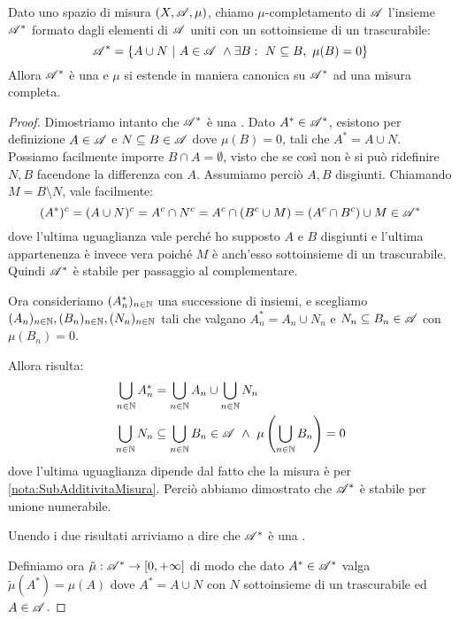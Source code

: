 \begin{proposition}\label{prop:CompletamentoMisura}
	Dato uno spazio di misura $(X,\mathscr A,\mu)$, chiamo $\mu$-completamento di $\mathscr A$ l'insieme $\mathscr A^*$ formato dagli elementi di $\mathscr A$ uniti con un sottoinsieme di un trascurabile:
	\begin{equation*}
		\A^*=\{A\cup N\ |\ A\in\A\ \wedge \exists B:\ N\subseteq B,\ \mu(B)=0\}
	\end{equation*}
	Allora $\mathscr A^*$ è una \sigalg{} e $\mu$ si estende in maniera canonica su $\mathscr A^*$ ad una misura completa.
\end{proposition}
\begin{proof}
	Dimostriamo intanto che $\mathscr A^*$ è una \sigalg{}.
	Dato $A^*\in\mathscr A^*$, esistono per definizione $A\in\mathscr A$ e $N\subseteq B\in\mathscr A$ dove $\mu(B)=0$, tali che $A^*=A\cup N$. Possiamo facilmente imporre $B\cap A=\emptyset$, visto che se così non è si può ridefinire $N,B$ facendone la differenza con $A$. Assumiamo perciò $A,B$ disgiunti.
	Chiamando $M=B\setminus N$, vale facilmente:
	\begin{equation*}
		(A^*)^c=(A\cup N)^c=A^c\cap N^c=A^c\cap(B^c\cup M)=(A^c\cap B^c )\cup M \in\mathscr A^*
	\end{equation*}
	dove l'ultima uguaglianza vale perché ho supposto $A$ e $B$ disgiunti e l'ultima appartenenza è invece vera poiché $M$ è anch'esso sottoinsieme di un trascurabile. Quindi $\mathscr A^*$ è stabile per passaggio al complementare.
	
	Ora consideriamo $(A^*_n)_{n\in\mathbb N}$ una successione di insiemi, e scegliamo $(A_n)_{n\in\mathbb N},(B_n)_{n\in\mathbb N},(N_n)_{n\in\mathbb N}$ tali che valgano $A^*_n=A_n\cup N_n$ e $N_n\subseteq B_n\in\mathscr A$ con $\mu(B_n)=0$.
	
	Allora risulta:
	\begin{align*}
		\bigcup_{n\in\N}A^*_n &=\bigcup_{n\in\N}A_n \cup \bigcup_{n\in\N}N_n\\
		\bigcup_{n\in\N}N_n &\subseteq \bigcup_{n\in\N}B_n\in\A\ \wedge\ \mu\left(\bigcup_{n\in\N}B_n\right)=0
	\end{align*}
	dove l'ultima uguaglianza dipende dal fatto che la misura è \sigsubadd{} per \cref{nota:SubAdditivitaMisura}. Perciò abbiamo dimostrato che $\mathscr A^*$ è stabile per unione numerabile.
	
	Unendo i due risultati arriviamo a dire che $\mathscr A^*$ è una \sigalg{}.
	
	Definiamo ora $\tilde\mu:\mathscr A^*\to[0,+\infty]$ di modo che dato $A^*\in\mathscr A^*$ valga $\tilde\mu(A^*)=\mu(A)$ dove $A^*=A\cup N$ con $N$ sottoinsieme di un trascurabile ed $A\in\mathscr A$.
	

\end{proof}

